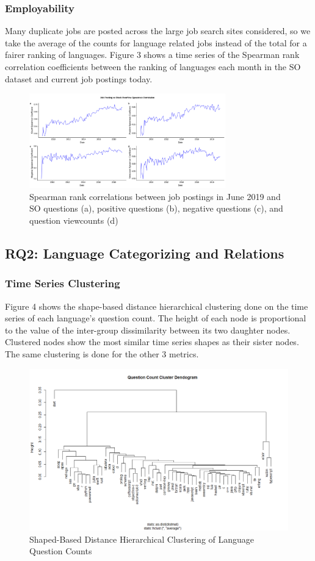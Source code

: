 \documentclass[conference]{IEEEtran}
\begin{document}
\subsubsection{Employability}
Many duplicate jobs are posted across the large job search sites considered, so we take the average of the counts for language related jobs instead of the total for a fairer ranking of languages. Figure 3 shows a time series of the Spearman rank correlation coefficients between the ranking of languages each month in the SO dataset and current job postings today.

\begin{figure}[h]
\includegraphics[width=8.5cm]{Jobspearman.png}
\centering
\caption{Spearman rank correlations between job postings in June 2019 and SO questions (a), positive questions (b), negative questions (c), and question viewcounts (d)}
\end{figure}

\subsection{RQ2: Language Categorizing and Relations}

\subsubsection{Time Series Clustering}
Figure 4 shows the shape-based distance hierarchical clustering done on the time series of each language's question count. The height of each node is proportional to the value of the inter-group dissimilarity between its two daughter nodes. Clustered nodes show the most similar time series shapes as their sister nodes. The same clustering is done for the other 3 metrics.

\begin{figure}[h]
\includegraphics[width=16cm]{countclust.png}
\centering
\caption{Shaped-Based Distance Hierarchical Clustering of Language Question Counts}
\end{figure}
\end{document}
